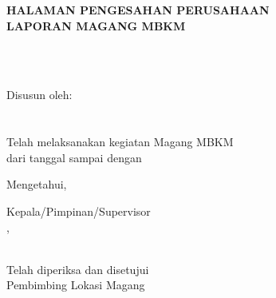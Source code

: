 \newpage

\begin{center}
    \begin{doublespace}
        \textbf{\large \MakeUppercase{Halaman Pengesahan Perusahaan \\ Laporan Magang MBKM}}
    \end{doublespace}
\end{center}

\begin{center}
    \textbf{\large \MakeUppercase {\normalsize{\judulid}}} \\
    \textbf{\large \MakeUppercase {\normalsize{\tempat}}} \\ [5cm]
\end{center}

\begin{center}
    Disusun oleh:\\
    \textbf{\underline{\penulis}}\\
    \textbf{\nim}\\[4cm]

    Telah melaksanakan kegiatan Magang MBKM \\
    dari tanggal \textbf{\tglMulai} sampai dengan \textbf{\tglSelesai} \\ [2cm]
\end{center}

\begin{center}
    Mengetahui, \\[1cm]
\end{center}
\begin{minipage}{0.45\textwidth}
    Kepala/Pimpinan/Supervisor\\
    \tempat,\\[2cm]
    \underline{\pimpinanPerusahaan}\\
    \jabatanPimpinan
\end{minipage}%
\hfill
 \begin{minipage}{0.35\textwidth}
    Telah diperiksa dan disetujui \\
    Pembimbing Lokasi Magang \\[2cm]
    \underline{\pembimbingPerusahaan}\\
    \jabatanPembimbing
\end{minipage}